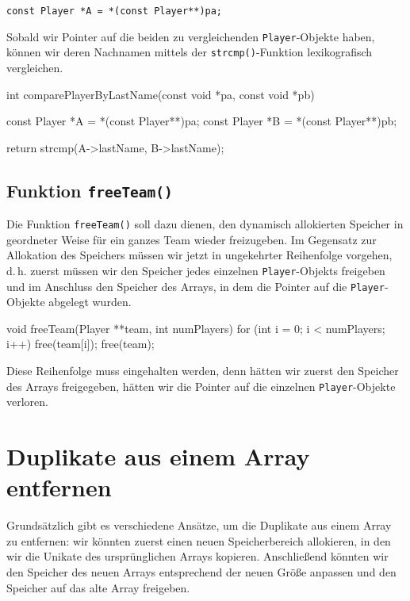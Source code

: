 \noindent\texttt{const Player *A = *(const Player**)pa;}

Sobald wir Pointer auf die beiden zu vergleichenden
\texttt{Player}-Objekte haben, können wir deren Nachnamen mittels der
\texttt{strcmp()}-Funktion lexikografisch vergleichen.

\begin{codebox}[lang=c, fontsize=\small]
int comparePlayerByLastName(const void *pa, const void *pb) {
    const Player *A = *(const Player**)pa;
    const Player *B = *(const Player**)pb;

    return strcmp(A->lastName, B->lastName);
}
\end{codebox}

\section*{Funktion \texttt{freeTeam()}}

Die Funktion \texttt{freeTeam()} soll dazu dienen, den dynamisch
allokierten Speicher in geordneter Weise für ein ganzes Team wieder freizugeben.
Im Gegensatz zur Allokation des Speichers müssen wir jetzt in ungekehrter
Reihenfolge vorgehen, d.\,h. zuerst müssen wir den Speicher jedes einzelnen
\texttt{Player}-Objekts freigeben und im Anschluss den Speicher des
Arrays, in dem die Pointer auf die \texttt{Player}-Objekte abgelegt
wurden.

\begin{codebox}[lang=c, fontsize=\small]
void freeTeam(Player **team, int numPlayers) {
    for (int i = 0; i < numPlayers; i++) {
        free(team[i]);
    }
    free(team);
}
\end{codebox}

Diese Reihenfolge muss eingehalten werden, denn hätten wir zuerst den Speicher
des Arrays freigegeben, hätten wir die Pointer auf die einzelnen
\texttt{Player}-Objekte verloren.




\chapter{Duplikate aus einem Array entfernen}

Grundsätzlich gibt es verschiedene Ansätze, um die Duplikate aus einem Array zu
entfernen: wir könnten zuerst einen neuen Speicherbereich allokieren, in den wir
die Unikate des ursprünglichen Arrays kopieren. Anschließend könnten wir den
Speicher des neuen Arrays entsprechend der neuen Größe anpassen und den Speicher
auf das alte Array freigeben.


